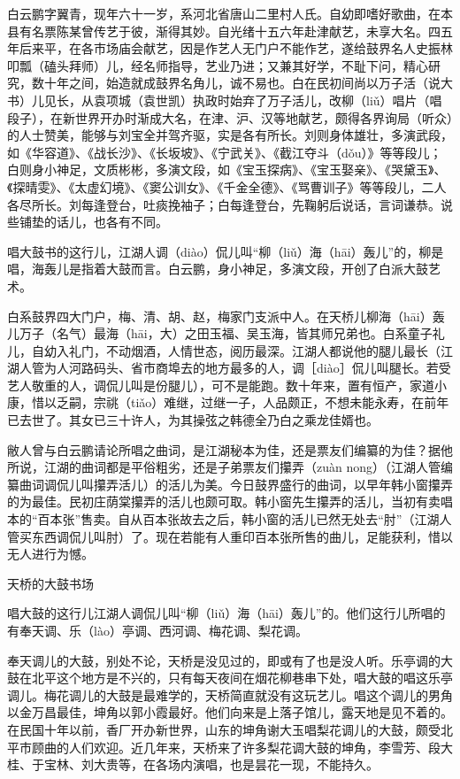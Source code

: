\documentclass[12pt,UTF8]{ctexbook}
\begin{document}
白云鹏字翼青，现年六十一岁，系河北省唐山二里村人氏。自幼即嗜好歌曲，在本县有名票陈某曾传艺于彼，渐得其妙。自光绪十五六年赴津献艺，未享大名。四五年后来平，在各市场庙会献艺，因是作艺人无门户不能作艺，遂给鼓界名人史振林叩瓢（磕头拜师）儿，经名师指导，艺业乃进；又兼其好学，不耻下问，精心研究，数十年之间，始造就成鼓界名角儿，诚不易也。白在民初间尚以万子活（说大书）儿见长，从袁项城（袁世凯）执政时始弃了万子活儿，改柳（liǔ）唱片（唱段子），在新世界开办时渐成大名，在津、沪、汉等地献艺，颇得各界询局（听众）的人士赞美，能够与刘宝全并驾齐驱，实是各有所长。刘则身体雄壮，多演武段，如《华容道》、《战长沙》、《长坂坡》、《宁武关》、《截江夺斗（dǒu）》等等段儿；白则身小神足，文质彬彬，多演文段，如《宝玉探病》、《宝玉娶亲》、《哭黛玉》、《探晴雯》、《太虚幻境》、《窦公训女》、《千金全德》、《骂曹训子》等等段儿，二人各尽所长。刘每逢登台，吐痰挽袖子；白每逢登台，先鞠躬后说话，言词谦恭。说些铺垫的话儿，也各有不同。

唱大鼓书的这行儿，江湖人调（diào）侃儿叫“柳（liǔ）海（hāi）轰儿”的，柳是唱，海轰儿是指着大鼓而言。白云鹏，身小神足，多演文段，开创了白派大鼓艺术。



白系鼓界四大门户，梅、清、胡、赵，梅家门支派中人。在天桥儿柳海（hāi）轰儿万子（名气）最海（hāi，大）之田玉福、吴玉海，皆其师兄弟也。白系童子礼儿，自幼入礼门，不动烟酒，人情世态，阅历最深。江湖人都说他的腿儿最长（江湖人管为人河路码头、省市商埠去的地方最多的人，调［diào］侃儿叫腿长。若受艺人敬重的人，调侃儿叫是份腿儿），可不是能跑。数十年来，置有恒产，家道小康，惜以乏嗣，宗祧（tiǎo）难继，过继一子，人品颇正，不想未能永寿，在前年已去世了。其女已三十许人，为其操弦之韩德全乃白之乘龙佳婿也。

敝人曾与白云鹏请论所唱之曲词，是江湖秘本为佳，还是票友们编纂的为佳？据他所说，江湖的曲词都是平俗粗劣，还是子弟票友们攥弄（zuàn nong）（江湖人管编纂曲词调侃儿叫攥弄活儿）的活儿为美。今日鼓界盛行的曲词，以早年韩小窗攥弄的为最佳。民初庄荫棠攥弄的活儿也颇可取。韩小窗先生攥弄的活儿，当初有卖唱本的“百本张”售卖。自从百本张故去之后，韩小窗的活儿已然无处去“肘”（江湖人管买东西调侃儿叫肘）了。现在若能有人重印百本张所售的曲儿，足能获利，惜以无人进行为憾。





天桥的大鼓书场


唱大鼓的这行儿江湖人调侃儿叫“柳（liǔ）海（hāi）轰儿”的。他们这行儿所唱的有奉天调、乐（lào）亭调、西河调、梅花调、梨花调。

奉天调儿的大鼓，别处不论，天桥是没见过的，即或有了也是没人听。乐亭调的大鼓在北平这个地方是不兴的，只有每天夜间在烟花柳巷串下处，唱大鼓的唱这乐亭调儿。梅花调儿的大鼓是最难学的，天桥简直就没有这玩艺儿。唱这个调儿的男角以金万昌最佳，坤角以郭小霞最好。他们向来是上落子馆儿，露天地是见不着的。在民国十年以前，香厂开办新世界，山东的坤角谢大玉唱梨花调儿的大鼓，颇受北平市顾曲的人们欢迎。近几年来，天桥来了许多梨花调大鼓的坤角，李雪芳、段大桂、于宝林、刘大贵等，在各场内演唱，也是昙花一现，不能持久。
\end{document}
